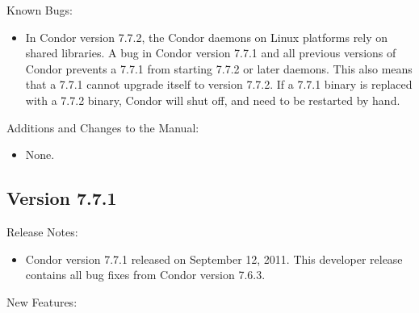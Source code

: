 \noindent Known Bugs:

\begin{itemize}

\item In Condor version 7.7.2, 
the Condor daemons on Linux platforms rely on shared libraries.  
A bug in Condor version 7.7.1 and all previous versions of Condor
prevents a 7.7.1  from starting 7.7.2 or later daemons.
This also means that a 7.7.1  cannot upgrade itself to 
version 7.7.2.  
If a 7.7.1  binary is replaced with 
a 7.7.2  binary, 
Condor will shut off, and need to be restarted by hand.

\end{itemize}

\noindent Additions and Changes to the Manual:

\begin{itemize}

\item None.

\end{itemize}


\subsection*{\label{sec:New-7-7-1}Version 7.7.1}

\noindent Release Notes:

\begin{itemize}

\item Condor version 7.7.1 released on September 12, 2011.
This developer release contains all bug fixes from Condor version 7.6.3.

\end{itemize}


\noindent New Features:

